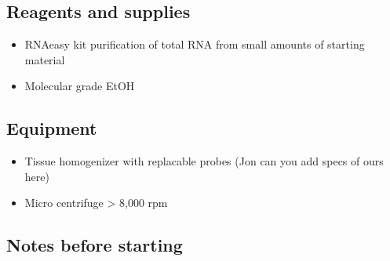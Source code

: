 \documentclass[
  letterpaper,
  DIV=11,
  numbers=noendperiod]{scrreprt}
\begin{document}
\hypertarget{reagents-and-supplies}{%
\subsection*{\texorpdfstring{\textbf{Reagents and
supplies}}{Reagents and supplies}}\label{reagents-and-supplies}}

\begin{itemize}
\item
  RNAeasy kit purification of total RNA from small amounts of starting
  material
\item
  Molecular grade EtOH
\end{itemize}

\hypertarget{equipment-1}{%
\subsection*{\texorpdfstring{\textbf{Equipment}}{Equipment}}\label{equipment-1}}

\begin{itemize}
\item
  Tissue homogenizer with replacable probes (Jon can you add specs of
  ours here)
\item
  Micro centrifuge \textgreater{} 8,000 rpm
\end{itemize}

\hypertarget{notes-before-starting}{%
\subsection*{\texorpdfstring{\textbf{Notes before
starting}}{Notes before starting}}\label{notes-before-starting}}
\end{document}
